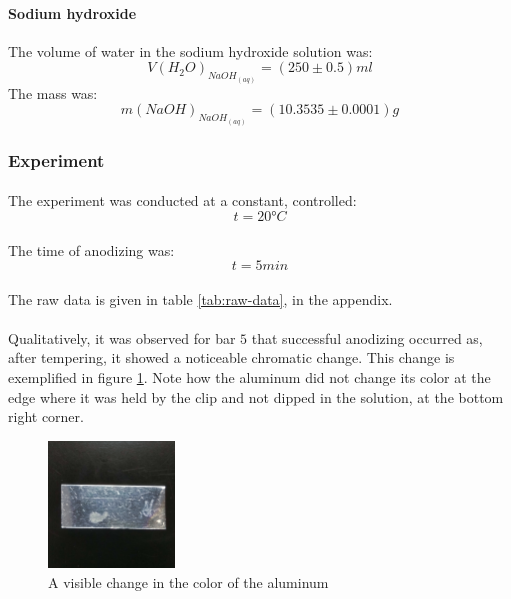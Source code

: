 \documentclass[a4paper]{article}
\begin{document}
\paragraph{Sodium hydroxide}
The volume of water in the sodium hydroxide solution was:
$$V(H_2O)_{NaOH_{(aq)}} = (250 \pm 0.5) \si{ml}$$
The mass was:
$$m(NaOH)_{NaOH_{(aq)}} = (10.3535 \pm 0.0001) \si{g}$$


\subsubsection{Experiment}

\paragraph*{}
The experiment was conducted at a constant, controlled:
$$t=20 \si{\degree C}$$

\paragraph*{}
The time of anodizing was:
$$t = 5 \si{min}$$

\paragraph*{}
The raw data is given in table \ref{tab:raw-data}, in the appendix.

\paragraph*{}
Qualitatively, it was observed for bar $5$ that successful anodizing occurred as,
after tempering, it showed a noticeable chromatic change. This change is
exemplified in figure \ref{fig:chromatic-change}. Note how the aluminum did not
change its color at the edge where it was held by the clip and not dipped in
the solution, at the bottom right corner.

\begin{figure}[ht]
  \centering
  \includegraphics[width=0.3\textwidth]{img/chromatic-change}
  \caption{A visible change in the color of the aluminum}
  \label{fig:chromatic-change}
\end{figure}
\end{document}
